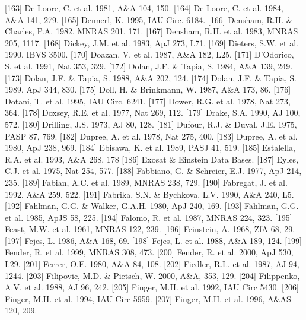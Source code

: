 \documentclass{aa}
\begin{document}
\begin{thebibliography}{}
\bibitem[]{}[163] De Loore, C. et al. 1981, A\&A 104, 150.
\bibitem[]{}[164] De Loore, C. et al. 1984, A\&A 141, 279.
\bibitem[]{}[165] Dennerl, K. 1995, IAU Circ. 6184.
\bibitem[]{}[166] Densham, R.H. \& Charles, P.A. 1982, MNRAS 201, 171.
\bibitem[]{}[167] Densham, R.H. et al. 1983, MNRAS 205, 1117.
\bibitem[]{}[168] Dickey, J.M. et al. 1983, ApJ 273, L71.
\bibitem[]{}[169] Dieters, S.W. et al. 1990, IBVS 3500.
\bibitem[]{}[170] Doazan, V. et al. 1987, A\&A 182, L25.
\bibitem[]{}[171] D'Odorico, S. et al. 1991, Nat 353, 329.
\bibitem[]{}[172] Dolan, J.F. \& Tapia, S. 1984, A\&A 139, 249.
\bibitem[]{}[173] Dolan, J.F. \& Tapia, S. 1988, A\&A 202, 124.
\bibitem[]{}[174] Dolan, J.F. \& Tapia, S. 1989, ApJ 344, 830.
\bibitem[]{}[175] Doll, H. \& Brinkmann, W. 1987, A\&A 173, 86.
\bibitem[]{}[176] Dotani, T. et al. 1995, IAU Circ. 6241. 
\bibitem[]{}[177] Dower, R.G. et al. 1978, Nat 273, 364.
\bibitem[]{}[178] Doxsey, R.E. et al. 1977, Nat 269, 112.
\bibitem[]{}[179] Drake, S.A. 1990, AJ 100, 572.
\bibitem[]{}[180] Drilling, J.S. 1973, AJ 80, 128.
\bibitem[]{}[181] Dufour, R.J. \& Duval, J.E. 1975, PASP 87, 769.
\bibitem[]{}[182] Dupree, A. et al. 1978, Nat 275, 400.
\bibitem[]{}[183] Dupree, A. et al. 1980, ApJ 238, 969.
\bibitem[]{}[184] Ebisawa, K. et al. 1989, PASJ 41, 519.
\bibitem[]{}[185] Estalella, R.A. et al. 1993, A\&A 268, 178  
\bibitem[]{}[186] Exosat \& Einstein Data Bases.
\bibitem[]{}[187] Eyles, C.J. et al. 1975, Nat 254, 577.
\bibitem[]{}[188] Fabbiano, G. \& Schreier, E.J. 1977, ApJ 214, 235.
\bibitem[]{}[189] Fabian, A.C. et al. 1989, MNRAS 238, 729.
\bibitem[]{}[190] Fabregat, J. et al. 1992, A\&A 259, 522.
\bibitem[]{}[191] Fabrika, S.N. \& Bychkova, L.V. 1990, A\&A 240, L5.
\bibitem[]{}[192] Fahlman, G.G. \& Walker, G.A.H. 1980, ApJ 240, 169.
\bibitem[]{}[193] Fahlman, G.G. et al. 1985, ApJS 58, 225.
\bibitem[]{}[194] Falomo, R. et al. 1987, MNRAS 224, 323.
\bibitem[]{}[195] Feast, M.W. et al. 1961, MNRAS 122, 239.
\bibitem[]{}[196] Feinstein, A. 1968, ZfA 68, 29.
\bibitem[]{}[197] Fejes, L. 1986, A\&A 168, 69.
\bibitem[]{}[198] Fejes, L. et al. 1988, A\&A 189, 124.
\bibitem[]{}[199] Fender, R. et al. 1999, MNRAS 308, 473.
\bibitem[]{}[200] Fender, R. et al. 2000, ApJ 530, L29.
\bibitem[]{}[201] Ferrer, O.E. 1980, A\&A 84, 108.
\bibitem[]{}[202] Fiedler, R.L. et al. 1987, AJ 94, 1244.
\bibitem[]{}[203] Filipovic, M.D. \& Pietsch, W. 2000, A\&A, 353, 129.  
\bibitem[]{}[204] Filippenko, A.V. et al. 1988, AJ 96, 242.
\bibitem[]{}[205] Finger, M.H. et al. 1992, IAU Circ 5430.
\bibitem[]{}[206] Finger, M.H. et al. 1994, IAU Circ 5959.
\bibitem[]{}[207] Finger, M.H. et al. 1996, A\&AS 120, 209.

\end{thebibliography}
\end{document}
